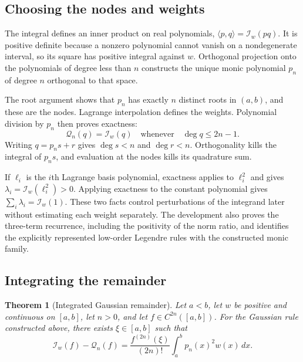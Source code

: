 \documentclass[11pt]{article}
\newtheorem{theorem}{Theorem}[section]
\newcommand{\I}{\mathcal{I}}
\newcommand{\Q}{\mathcal{Q}}
\begin{document}
\subsection{Choosing the nodes and weights}

The integral defines an inner product on real polynomials,
$\langle p,q\rangle=\I_w(pq)$. It is positive definite because a nonzero
polynomial cannot vanish on a nondegenerate interval, so its square has
positive integral against $w$. Orthogonal projection onto the polynomials
of degree less than $n$ constructs the unique monic polynomial $p_n$ of
degree $n$ orthogonal to that space.

The root argument shows that $p_n$ has exactly $n$ distinct roots in
$(a,b)$, and these are the nodes. Lagrange interpolation defines the
weights. Polynomial division by $p_n$ then proves exactness:
\begin{equation}
  \Q_n(q)=\I_w(q)
  \quad\text{whenever}\quad \deg q\le 2n-1.
  \label{eq:exactness}
\end{equation}
Writing $q=p_ns+r$ gives $\deg s<n$ and $\deg r<n$. Orthogonality kills the
integral of $p_ns$, and evaluation at the nodes kills its quadrature sum.

If $\ell_i$ is the $i$th Lagrange basis polynomial, exactness applies to
$\ell_i^2$ and gives $\lambda_i=\I_w(\ell_i^2)>0$. Applying exactness to
the constant polynomial gives $\sum_i\lambda_i=\I_w(1)$. These two facts
control perturbations of the integrand later without estimating each
weight separately. The development also proves the three-term recurrence,
including the positivity of the norm ratio, and identifies the explicitly
represented low-order Legendre rules with the constructed monic family.

\subsection{Integrating the remainder}

\begin{theorem}[Integrated Gaussian remainder]
\label{thm:remainder}
Let $a<b$, let $w$ be positive and continuous on $[a,b]$, let $n>0$, and let
$f\in C^{2n}([a,b])$. For the Gaussian rule constructed above, there exists
$\xi\in[a,b]$ such that
\begin{equation}
 \I_w(f)-\Q_n(f)
  = \frac{f^{(2n)}(\xi)}{(2n)!}\int_a^b p_n(x)^2w(x)\,dx .
 \label{eq:remainder}
\end{equation}
\end{theorem}
\end{document}
